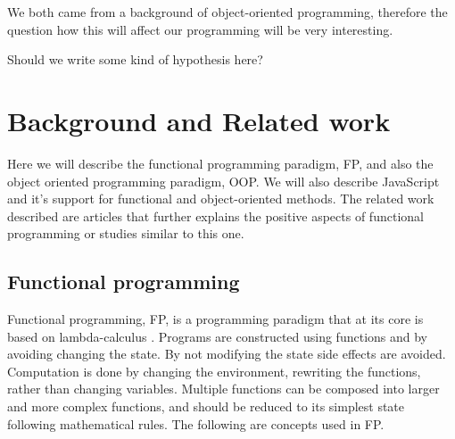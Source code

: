 \documentclass {article}
\begin{document}
We both came from a background of object-oriented programming, therefore 
the question how this will affect our programming will be very interesting. 

Should we write some kind of hypothesis here?

\section{Background and Related work}
Here we will describe the functional programming paradigm, FP, and also the object oriented programming paradigm, OOP. We will also describe JavaScript and it's support for functional and object-oriented methods. The related work described are articles that further explains the positive aspects of functional programming or studies similar to this one.
\subsection{Functional programming}
Functional programming, FP, is a programming paradigm that at its core is based on lambda-calculus \cite{gabmar}. Programs are constructed using functions and by avoiding changing the state. By not modifying the state side effects are avoided. Computation is done by changing the environment, rewriting the functions, rather than changing variables. Multiple functions can be composed into larger and more complex functions, and should be reduced to its simplest state following mathematical rules. The following are concepts used in FP.
\end{document}
